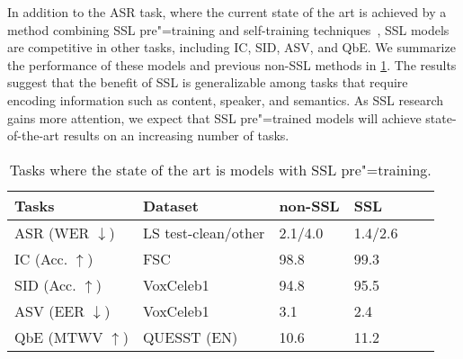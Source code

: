 In addition to the ASR task, where the current state of the art is achieved by a method
combining SSL pre"=training and self-training 
techniques~\parencite{zhang_pushing_2020}, SSL models are competitive in other tasks, including IC,
SID, ASV, and QbE. We summarize the performance of these models and previous
non-SSL methods in \cref{table:sota_performance}. The results suggest that the
benefit of SSL is generalizable among tasks that require encoding 
information such as content, speaker, and semantics. As SSL research
gains more attention, we expect that SSL pre"=trained models will 
achieve state-of-the-art results on an increasing number of tasks.

\begin{table}[t]
  \centering
  \footnotesize
  \caption{Tasks where the state of the art is models with SSL pre"=training.}
  \label{table:sota_performance}
  \renewcommand*\arraystretch{1.2}
  \begin{tabular}{llllll}  
    \toprule
    Tasks & Dataset & non-SSL & SSL \\
    \midrule
    ASR (WER $\downarrow$) & LS test-clean/other & 2.1/4.0 \parencite{xu_iterative_2020} & 1.4/2.6 \parencite{zhang_pushing_2020} \\ \hline
    IC (Acc. $\uparrow$) & FSC & 98.8 \parencite{lugosch_speech_2019} & 99.3\parencite{chen_unispeechsat_2021} \\ \hline
    SID (Acc. $\uparrow$) & VoxCeleb1 & 94.8 \parencite{hajibabaei_unified_2018} & 95.5 \parencite{chen_wavlm_2021} \\ \hline
    ASV (EER $\downarrow$) & VoxCeleb1 & 3.1 \parencite{hajavi_siamese_2021} & 2.4 \parencite{wang_finetuned_2021} \\ \hline
    QbE (MTWV $\uparrow$) & QUESST (EN) & 10.6 \parencite{rodriguez-fuentes_gttsehu_2014} & 11.2\parencite{chen_unispeechsat_2021} \\
    \bottomrule
  \end{tabular}
\end{table}

